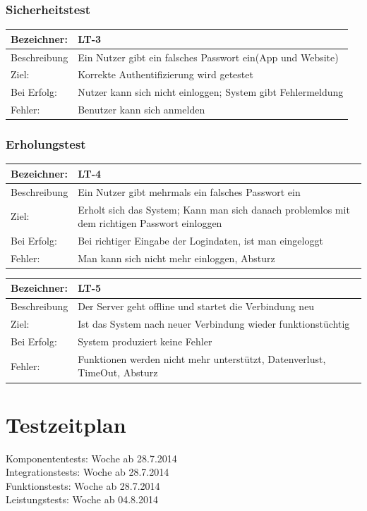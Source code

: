 \documentclass[fontsize=12pt,paper=a4,twoside]{scrartcl}
\begin{document}
\subsubsection{Sicherheitstest}

\begin{tabular}{|l|p{13.75cm}|}
\hline
	Bezeichner: & LT-3\\
\hline
	Beschreibung & Ein Nutzer gibt ein falsches Passwort ein(App und Website)\\
\hline
	Ziel: & Korrekte Authentifizierung wird getestet\\
\hline
	Bei Erfolg: & Nutzer kann sich nicht einloggen; System gibt Fehlermeldung\\
\hline
	Fehler: & Benutzer kann sich anmelden\\
\hline
\end{tabular}

\subsubsection{Erholungstest}

\begin{tabular}{|l|p{13.75cm}|}
\hline
	Bezeichner: & LT-4\\
\hline
	Beschreibung & Ein Nutzer gibt mehrmals ein falsches Passwort ein\\
\hline
	Ziel: & Erholt sich das System; Kann man sich danach problemlos mit dem richtigen Passwort einloggen\\
\hline
	Bei Erfolg: & Bei richtiger Eingabe der Logindaten, ist man eingeloggt\\
\hline
	Fehler: & Man kann sich nicht mehr einloggen, Absturz\\
\hline
\end{tabular}

\begin{tabular}{|l|p{13.75cm}|}
\hline
	Bezeichner: & LT-5\\
\hline
	Beschreibung & Der Server geht offline und startet die Verbindung neu\\
\hline
	Ziel: & Ist das System nach neuer Verbindung wieder funktionstüchtig\\
\hline
	Bei Erfolg: & System produziert keine Fehler\\
\hline
	Fehler: & Funktionen werden nicht mehr unterstützt, Datenverlust, TimeOut, Absturz\\
\hline
\end{tabular}


\section{Testzeitplan}
\label{sec:testzeitplan}
Komponententests: Woche ab 28.7.2014\\
Integrationstests: Woche ab 28.7.2014\\
Funktionstests: Woche ab 28.7.2014\\
Leistungstests: Woche ab 04.8.2014\\
\end{document}

